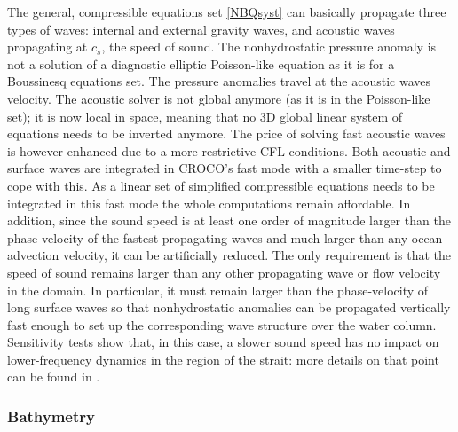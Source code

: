 The general, compressible equations set \ref{NBQsyst} can basically propagate three types of waves: internal and external gravity waves, and acoustic waves propagating at $c_s$, the speed of sound. The nonhydrostatic pressure anomaly is not a solution of a diagnostic elliptic Poisson-like equation as it is for a Boussinesq equations set. The pressure anomalies travel at the acoustic waves velocity. The acoustic solver is not global anymore (as it is in the Poisson-like set); it is now local in space, meaning that no 3D global linear system of equations needs to be inverted anymore. The price of solving fast acoustic waves is however enhanced due to a more restrictive CFL conditions. Both acoustic and surface waves are integrated in CROCO's fast mode with a smaller time-step to cope with this. As a linear set of simplified compressible equations needs to be integrated in this fast mode the whole computations remain affordable. In addition, since the sound speed is at least one order of magnitude larger than the phase-velocity of the fastest propagating waves and much larger than any ocean advection velocity, it can be artificially reduced. The only requirement is that the speed of sound remains larger than any other propagating wave or flow velocity in the domain. In particular, it must remain larger than the phase-velocity of long surface waves so that nonhydrostatic anomalies can be propagated vertically fast enough to set up the corresponding wave structure over the water column. Sensitivity tests show that, in this case, a slower sound speed has no impact on lower-frequency dynamics in the region of the strait: more details on that point can be found in \citet{Auclair2018}. 



 \subsubsection{Bathymetry}
 \label{BathyNum}

